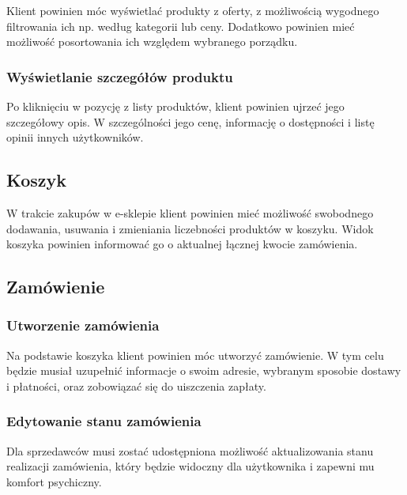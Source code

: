 \documentclass[a4paper]{article}
\begin{document}
Klient powinien móc wyświetlać produkty z oferty, z możliwością wygodnego filtrowania ich np. według kategorii lub ceny. Dodatkowo powinien mieć możliwość posortowania ich względem wybranego porządku. 

\subsubsection{Wyświetlanie szczegółów produktu}

Po kliknięciu w pozycję z listy produktów, klient powinien ujrzeć jego szczegółowy opis. W szczególności jego cenę, informację o dostępności i listę opinii innych użytkowników.

\subsection{Koszyk}

W trakcie zakupów w e-sklepie klient powinien mieć możliwość swobodnego dodawania, usuwania i zmieniania liczebności produktów w koszyku. Widok koszyka powinien informować go o aktualnej łącznej kwocie zamówienia.

\subsection{Zamówienie}

\subsubsection{Utworzenie zamówienia}

Na podstawie koszyka klient powinien móc utworzyć zamówienie. W tym celu będzie musiał uzupełnić informacje o swoim adresie, wybranym sposobie dostawy i płatności, oraz zobowiązać się do uiszczenia zapłaty.

\subsubsection{Edytowanie stanu zamówienia}

Dla sprzedawców musi zostać udostępniona możliwość aktualizowania stanu realizacji zamówienia, który będzie widoczny dla użytkownika i zapewni mu komfort psychiczny.
\end{document}
